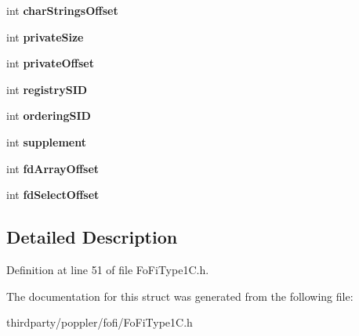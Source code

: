 \begin{DoxyCompactItemize}
int {\bfseries char\+Strings\+Offset}
\item 
\mbox{\label{struct_type1_c_top_dict_af359a3d4bbe1b59e6796178a049ad262}} 
int {\bfseries private\+Size}
\item 
\mbox{\label{struct_type1_c_top_dict_a11474a0e853194afdc4535ef2a54cc36}} 
int {\bfseries private\+Offset}
\item 
\mbox{\label{struct_type1_c_top_dict_a62b60febe6abfced872e431e7dbab692}} 
int {\bfseries registry\+S\+ID}
\item 
\mbox{\label{struct_type1_c_top_dict_ad80b7593d24c25f8851111d95dc9beb0}} 
int {\bfseries ordering\+S\+ID}
\item 
\mbox{\label{struct_type1_c_top_dict_a4f3ed1c4279d6bef6c547ee5add74930}} 
int {\bfseries supplement}
\item 
\mbox{\label{struct_type1_c_top_dict_a1f36c05a66ffa925aeb2c7db264f23c9}} 
int {\bfseries fd\+Array\+Offset}
\item 
\mbox{\label{struct_type1_c_top_dict_ad8b08ba9328898376702aee10dfd395d}} 
int {\bfseries fd\+Select\+Offset}
\end{DoxyCompactItemize}


\subsection{Detailed Description}


Definition at line 51 of file Fo\+Fi\+Type1\+C.\+h.



The documentation for this struct was generated from the following file\+:\begin{DoxyCompactItemize}
\item 
thirdparty/poppler/fofi/Fo\+Fi\+Type1\+C.\+h\end{DoxyCompactItemize}
